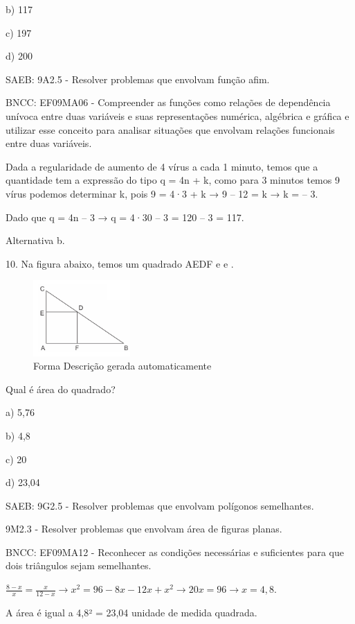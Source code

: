 \begin{escolha}
{{{\begin{escolha}
{{{{{\begin{escolha}
\begin{escolha}
{\begin{q°}
b) 117

c) 197

d) 200

SAEB: 9A2.5 - Resolver problemas que envolvam função afim.

BNCC: EF09MA06 - Compreender as funções como relações de dependência
unívoca entre duas variáveis e suas representações numérica, algébrica e
gráfica e utilizar esse conceito para analisar situações que envolvam
relações funcionais entre duas variáveis.

Dada a regularidade de aumento de 4 vírus a cada 1 minuto, temos que a
quantidade tem a expressão do tipo q = 4n + k, como para 3 minutos temos
9 vírus podemos determinar k, pois 9 = 4·3 + k → 9 -- 12 = k → k = -- 3.

Dado que q = 4n -- 3 → q = 4·30 -- 3 = 120 -- 3 = 117.

Alternativa b.

10. Na figura abaixo, temos um quadrado AEDF e e .

\begin{figure}
\centering
\includegraphics[width=1.46354in,height=1.13788in]{./_SAEB_9_MAT/media/image267.png}
\caption{Forma Descrição gerada automaticamente}
\end{figure}

Qual é área do quadrado?

a) 5,76

b) 4,8

c) 20

d) 23,04

SAEB: 9G2.5 - Resolver problemas que envolvam polígonos semelhantes.

9M2.3 - Resolver problemas que envolvam área de figuras planas.

BNCC: EF09MA12 - Reconhecer as condições necessárias e suficientes para
que dois triângulos sejam semelhantes.

\(\frac{8 - x}{x} = \frac{x}{12 - x} \rightarrow x^{2} = 96 - 8x - 12x + x^{2} \rightarrow 20x = 96 \rightarrow x = 4,8\).

A área é igual a 4,8² = 23,04 unidade de medida quadrada.


\end{q°}}
\end{escolha}
\end{escolha}}}}}}
\end{escolha}}}}
\end{escolha}
